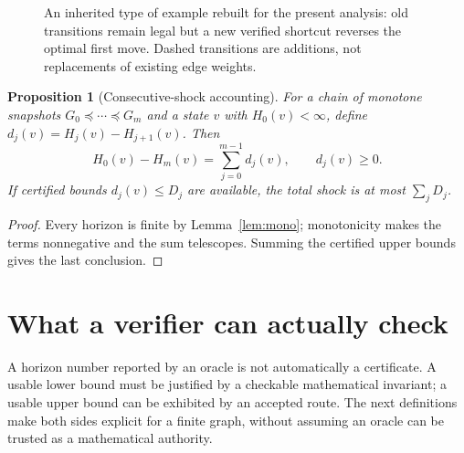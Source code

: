 \documentclass[11pt]{article}
\newtheorem{proposition}[theorem]{Proposition}
\theoremstyle{definition}\newtheorem{definition}[theorem]{Definition}\newtheorem{assumption}[theorem]{Assumption}
\theoremstyle{remark}\newtheorem{remark}[theorem]{Remark}
\begin{document}
\begin{figure}[htbp]\centering
{}
\caption{An inherited type of example rebuilt for the present analysis: old transitions remain legal but a new verified shortcut reverses the optimal first move. Dashed transitions are additions, not replacements of existing edge weights.}\label{fig:shortcut}
\end{figure}

\begin{proposition}[Consecutive-shock accounting]\label{prop:telescoping}
For a chain of monotone snapshots $G_0\preceq\cdots\preceq G_m$ and a state $v$ with $H_0(v)<\infty$, define $d_j(v)=H_j(v)-H_{j+1}(v)$. Then
\[
H_0(v)-H_m(v)=\sum_{j=0}^{m-1}d_j(v),\qquad d_j(v)\geq0.
\]
If certified bounds $d_j(v)\leq D_j$ are available, the total shock is at most $\sum_jD_j$.
\end{proposition}
\begin{proof}
Every horizon is finite by Lemma~\ref{lem:mono}; monotonicity makes the terms nonnegative and the sum telescopes. Summing the certified upper bounds gives the last conclusion.
\end{proof}
\par


\section{What a verifier can actually check}
\label{sec:evidence}
A horizon number reported by an oracle is not automatically a certificate. A usable lower bound must be justified by a checkable mathematical invariant; a usable upper bound can be exhibited by an accepted route. The next definitions make both sides explicit for a finite graph, without assuming an oracle can be trusted as a mathematical authority.
\end{document}
